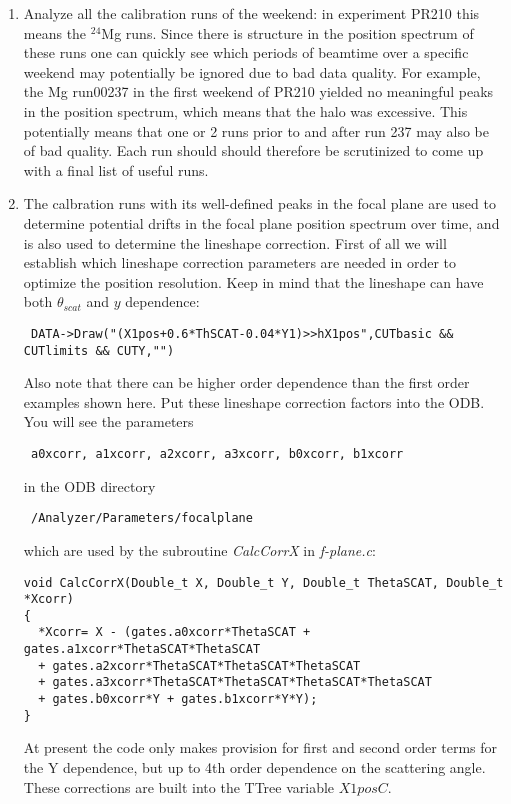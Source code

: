 \documentclass[11pt]{report}
\begin{document}
\begin{enumerate}
\item
Analyze all the calibration runs of the weekend: in experiment PR210 this means
the $^{24}$Mg runs. Since there is structure in the position spectrum of these runs
one can quickly see which periods of beamtime over a specific weekend 
may potentially be ignored due to bad data quality.
For example, the Mg run00237 in the first weekend of PR210 yielded no meaningful peaks 
in the position spectrum, which means that the halo was excessive. This potentially means
that one or 2 runs prior to and after run 237 may also be of bad quality. Each run should
should therefore be scrutinized to come up with a final list of useful runs.

\item 
The calbration runs with its well-defined peaks in the focal plane are used to
determine potential drifts in the focal plane position spectrum over time, and is also
used to determine the lineshape correction.
First of all we will 
establish which lineshape correction parameters are needed in order to optimize the position resolution.
Keep in mind that the lineshape can have both $\theta_{scat}$ and $y$ dependence:
\begin{verbatim} DATA->Draw("(X1pos+0.6*ThSCAT-0.04*Y1)>>hX1pos",CUTbasic && CUTlimits && CUTY,"")  \end{verbatim}
Also note that there can be higher order dependence than the first order examples shown here.
Put these lineshape correction factors into the ODB.
You will see the parameters
\begin{verbatim} a0xcorr, a1xcorr, a2xcorr, a3xcorr, b0xcorr, b1xcorr \end{verbatim}
in the ODB directory
\begin{verbatim} /Analyzer/Parameters/focalplane  \end{verbatim}
which are used by the subroutine {\it CalcCorrX} in {\it f-plane.c}: 
\begin{verbatim} 
void CalcCorrX(Double_t X, Double_t Y, Double_t ThetaSCAT, Double_t *Xcorr)
{
  *Xcorr= X - (gates.a0xcorr*ThetaSCAT + gates.a1xcorr*ThetaSCAT*ThetaSCAT 
  + gates.a2xcorr*ThetaSCAT*ThetaSCAT*ThetaSCAT 
  + gates.a3xcorr*ThetaSCAT*ThetaSCAT*ThetaSCAT*ThetaSCAT 
  + gates.b0xcorr*Y + gates.b1xcorr*Y*Y);
}
\end{verbatim}
At present the code only makes provision for first and second order terms for the Y dependence, but
up to 4th order dependence on the scattering angle.
These corrections are built into the TTree variable $X1posC$.  


\end{enumerate}
\end{document}
